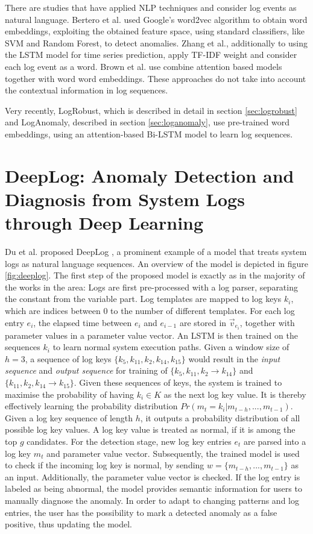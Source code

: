 There are studies that have applied NLP techniques and consider log events as natural language. Bertero et al. \cite{bertero2017experience} used Google's word2vec algorithm to obtain word embeddings, exploiting the obtained feature space, using standard classifiers, like SVM and Random Forest, to detect anomalies. Zhang et al.\cite{zhang2016automated}, additionally to using the LSTM model for time series prediction, apply TF-IDF weight and consider each log event as a word. Brown et al. \cite{brown2018recurrent} use combine attention based models together with word word embeddings. These approaches do not take into account the contextual information in log sequences.

Very recently, LogRobust, which is described in detail in section \ref{sec:logrobust} and LogAnomaly, described in section \ref{sec:loganomaly}, use pre-trained word embeddings, using an attention-based Bi-LSTM model to learn log sequences.


\section{DeepLog: Anomaly Detection and Diagnosis from System Logs through Deep Learning \label{sec:deeplog}}
Du et al. proposed DeepLog \cite{du2017deeplog}, a prominent example of a model that treats system logs as natural language sequences. An overview of the model is depicted in figure \ref{fig:deeplog}. The first step of the proposed model is exactly as in the majority of the works in the area: Logs are first pre-processed with a log parser, separating the constant from the variable part. Log templates are mapped to log keys $k_i$, which are  indices between $0$ to the number of different templates. For each log entry $e_i$, the elapsed time between $e_i$ and $e_{i-1}$ are stored in $\vec{v}_{e_i}$, together with parameter values in a parameter value vector. An LSTM is then trained on the sequences $k_i$ to learn normal system execution paths. Given a window size of $h=3$, a sequence of log keys $\{k_5, k_{11}, k_2, k_{14}, k_{15}\}$ would result in the \textit{input sequence} and \textit{output sequence} for training of $\{k_{5},k_{11},k_{2} \rightarrow k_{14}\}$ and $\{k_{11},k_{2},k_{14} \rightarrow k_{15}\}$. Given these sequences of keys, the system is trained to maximise the probability of having $k_i \in K$ as the next log key value. It is thereby effectively learning the probability distribution $Pr(m_t = k_i | m_{t-h},...,m_{t-1})$. Given a log key sequence of length $h$, it outputs a probability distribution of all possible log key values. A log key value is treated as normal, if it is among the top $g$ candidates.
 For the detection stage, new log key entries $e_t$ are parsed into a log key $m_t$ and parameter value vector. Subsequently, the trained model is used to check if the incoming log key is normal, by sending $w = \{m_{t-h}, ..., m_{t-1}\}$ as an input. Additionally, the parameter value vector is checked. If the log entry is labeled as being abnormal, the model provides semantic information for users to manually diagnose the anomaly. In order to adapt to changing patterns and log entries, the user has the possibility to mark a detected anomaly as a false positive, thus updating the model.

